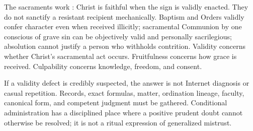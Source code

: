 The sacraments work : Christ is faithful when the sign is validly enacted. They do not sanctify a resistant recipient mechanically. Baptism and Orders validly confer character even when received illicitly; sacramental Communion by one conscious of grave sin can be objectively valid and personally sacrilegious; absolution cannot justify a person who withholds contrition. Validity concerns whether Christ's sacramental act occurs. Fruitfulness concerns how grace is received. Culpability concerns knowledge, freedom, and consent.

If a validity defect is credibly suspected, the answer is not Internet diagnosis or casual repetition. Records, exact formulas, matter, ordination lineage, faculty, canonical form, and competent judgment must be gathered. Conditional administration has a disciplined place where a positive prudent doubt cannot otherwise be resolved; it is not a ritual expression of generalized mistrust.

